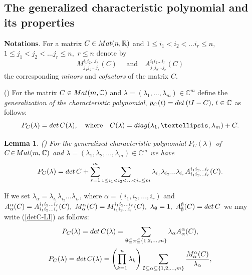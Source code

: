 \documentclass[preprint,12pt]{elsarticle}
\newtheorem{lem}[thm]{Lemma}
\numberwithin{equation}{section}
\begin{document}
\subsection{The generalized characteristic polynomial
and its properties}
\label{sec.gen.har.pol}
%
%
{\bf Notations}. For a matrix $C\in {\rm Mat}(n,\mathbb R)$  and $1\leq i_1<i_2<\dots i_r\leq n,$ 
$1\leq j_1<j_2<\dots j_r\leq n,\,\,r\leq n$
denote by 
$$
M^{i_1i_2\dots i_r}_{j_1j_2\dots j_r}(C)\quad\text{ and} \quad
A^{i_1i_2\dots i_r}_{j_1j_2\dots j_r}(C)
$$
the corresponding {\it minors} and {\it cofactors} of the matrix $C$.
%
\begin{df}{\rm (\cite[Ch.1.4.3]{Kos_B_09})}
\label{d.G_k(lambda)} 
For the matrix $C\in {\rm
Mat}(m,{\mathbb C})$ and $\lambda =(\lambda_1,\dots,\lambda_m)\in {\mathbb C}^m$ define  the {\it
generalization of the characteristic polynomial}, $p_C(t)={\rm
det}\,(tI-C),\, t\in {\mathbb C}$  
as follows:
\begin{equation}
\label{P_C(lambda)}
P_C(\lambda)={\rm det}\,C(\lambda),\quad\text{where}\quad
C(\lambda)=
{\rm diag}(\lambda_1,\dots,\lambda_m)
+C.
\end{equation}
%
\end{df}
\begin{lem}
\label{l.detC-LI}
{\rm (\cite[Ch.1.4.3]{Kos_B_09})}
For the generalized characteristic polynomial $P_C(\lambda)$
of
$C\!\in\!{\rm Mat}(m,{\mathbb C})$ and
 $\lambda=(\lambda_1,\lambda_2,...,\lambda_m)\in {\mathbb
C}^m$ we have 
\begin{equation}
\label{detC-LI}
P_C(\lambda)=
{\rm det}\,C+
\sum_{r=1}^m\sum_{1\leq i_1<i_2<...<i_r\leq
m}\lambda_{i_1}\lambda_{i_2}...\lambda_{i_r}A^{i_1i_2...i_r}_{i_1i_2...i_r}(C).
\end{equation}
\end{lem}
\begin{rem}
\label{r.P_C(lam)}
If we set
$\lambda_\alpha=\lambda_{i_1}\lambda_{i_2}...\lambda_{i_r}$, where
$\alpha=(i_1,i_2,...,i_r)$ and
$A^\alpha_\alpha(C)=A^{i_1i_2...i_r}_{i_1i_2...i_r}(C),\,\,
M^\alpha_\alpha(C)=M^{i_1i_2...i_r}_{i_1i_2...i_r}(C),\,\,
\lambda_\emptyset=1,\,\,A^\emptyset_\emptyset(C)={\rm det}\,C$ we
may write (\ref{detC-LI}) as follows:
\begin{equation}
\label{A.detC-LI.2} 
P_C(\lambda)={\rm det}\,C(\lambda)=
\sum_{\emptyset\subseteq\alpha\subseteq\{1,2,...,m\}}\lambda_\alpha
A^\alpha_\alpha(C),
\end{equation}
\begin{equation}
\label{M.detC-LI.2}
P_C(\lambda)={\rm det}\,C(\lambda)=
\left(\prod_{k=1}^n\lambda_k\right)\sum_{\emptyset\subseteq\alpha\subseteq\{1,2,...,m\}}
\frac{M^\alpha_\alpha(C)}{\lambda_\alpha},
\end{equation}
\end{rem}
\end{document}
